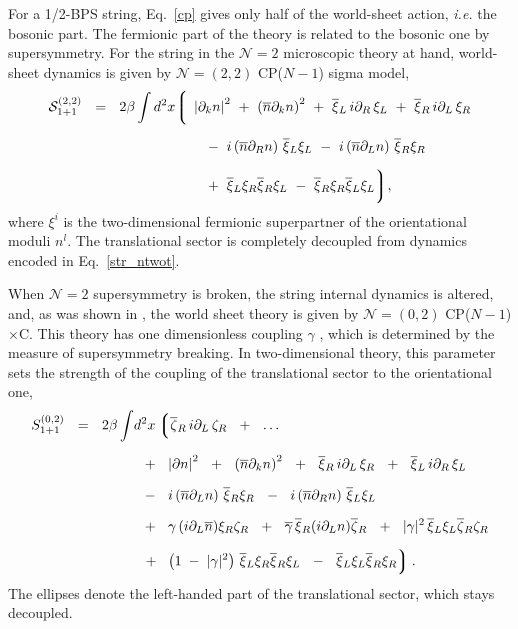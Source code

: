 \documentclass[12pt]{article}
\newcommand{\ntwo}{${\mathcal N}=2$ }
\newcommand{\ntwot}{${\mathcal N}= \left(2,2\right) $ }
\newcommand{\ntwoo}{${\mathcal N}= \left(0,2\right) $ }
\newcommand{\p}{\partial}
\newcommand{\ov}{\overline}
\newcommand{\mc}[1]{\mathcal{#1}}
\newcommand{\lgr}{\left\lgroup}
\newcommand{\rgr}{\right\rgroup}
\newcommand{\bxir}{\ov{\xi}{}_R}
\newcommand{\bxil}{\ov{\xi}{}_L}
\newcommand{\xir}{\xi_R}
\newcommand{\xil}{\xi_L}
\newcommand{\bzl}{\ov{\zeta}{}_L}
\newcommand{\bzr}{\ov{\zeta}{}_R}
\newcommand{\zr}{\zeta_R}
\newcommand{\zl}{\zeta_L}
\newcommand{\nbar}{\ov{n}}
\newcommand{\CPCn}{CP($N-1$)$\times$C}
\begin{document}
	For a 1/2-BPS string, Eq.~\eqref{cp} gives only half of the world-sheet action, {\it i.e.} the bosonic part.
	The fermionic part of the theory is related to the bosonic one by supersymmetry.
	For the string in the \ntwo microscopic theory at hand, world-sheet dynamics is given 
	by \ntwot CP($N-1$) sigma model,
\begin{align}
%
\notag
\mc{S}_{\rm 1+1}^{\rm (2,2)}  ~~=~~ 2\beta
	\int  d^2x
	\biggl\lgroup\; 
	&
	\left|\p_k n \right|^2  ~+~ \left(\ov{n}\p_k n\right)^2  
	~+~ \ov{\xi}{}_L\, i\p_R\, \xi_L  ~+~ \ov{\xi}{}_R\, i\p_L\,  \xi_R 
	\\[2mm]
%
\label{str_ntwot}
	&\;
	~~-~
	i \left(\nbar\p_R n\right)\, \bxil\xil ~-~ i \left(\nbar\p_Ln\right) \, \bxir\xir 
	\\[2mm]
%
\notag
	&\;
		~~+~
		\bxil \xir \bxir \xil ~-~ \bxir \xir \bxil \xil
	\biggr\rgroup ,
\end{align}
	where $ \xi^i $ is the two-dimensional fermionic superpartner of the orientational moduli $ n^l $.
	The translational sector is completely decoupled from dynamics encoded in  Eq.~\eqref{str_ntwot}.

	When \ntwo supersymmetry is broken, the string internal dynamics is altered, and, as was shown
	in \cite{Edalati}, the world sheet theory is given by \ntwoo \CPCn.
	This theory has one dimensionless coupling $ \gamma $ \cite{SYhet,BSYhet}, which is determined by the
	measure of supersymmetry breaking.
	In two-dimensional theory, this parameter sets the strength of the coupling of the translational
	sector to the orientational one,
\begin{align}
%
\notag
S_{1+1}^{(0,2)} ~~=~~ 2\beta
	\int & d^2 x 
\lgr
	\bzr\, i\p_L\, \zr ~~+~~ \dots 
\right.
	\\[2mm]
%
\notag
	&
	\;\;
	+~~
	\left|\p n\right|^2 ~~+~~ \left(\ov{n}\p_k n\right)^2 ~~+~~
	\bxir \, i\p_L \, \xir  ~~+~~ \bxil \, i\p_R \, \xil 
	\\[2mm]
%
\label{world02}
	&
	\;\;
	-~~
	i \left(\ov{n}\p_L n\right)\, \bxir \xir ~~-~~ 
	i \left(\ov{n}\p_R n\right)\, \bxil \xil  
	\\[2mm]
%
\notag
	&
	\;\;
	+~~
	\gamma\, (i\p_L\nbar) \xir\zr ~~+~~ \ov{\gamma}\, \bxir (i\p_L n) \bzr ~~+~~
	|\gamma|^2\, \bxil\xil \bzr\zr  
	\\[2mm]
%
\notag
	&
	\;\;
\left.
	+~~ 
	\left( 1 \;-\; |\gamma|^2 \right)\, \bxil\xir \bxir\xil  
	~~-~~ \bxil\xil \bxir\xir
\rgr .
\end{align}
	The ellipses denote the left-handed part of the translational sector, which stays decoupled.
\end{document}
